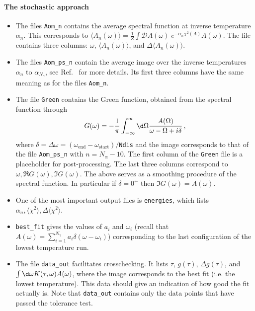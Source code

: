\paragraph*{The stochastic  approach}
\begin{itemize}
\item The files  \texttt{Aom\_n} contains the average spectral function at inverse temperature  $ \alpha_n $. This corresponds to
$  \langle A_n(\omega) \rangle =   \frac{1}{Z}   \int \mathcal{D}\!A(\omega) \; e^{-\alpha_n \chi^{2}(A)  } A(\omega). $
The file contains three columns: $\omega$, $\langle A_n(\omega) \rangle$, and $\Delta \langle A_n(\omega) \rangle$.

\item The files \texttt{Aom\_ps\_n}  contain the average image over the inverse  temperatures  $ \alpha_n $ to $ \alpha_{N_\gamma}$, see Ref.~\cite{Beach04a} for more details.   
 Its first three columns have the same meaning as for the files \texttt{Aom\_n}.

\item The file \texttt{Green} contains the Green function, obtained from the spectral function through
\begin{equation}
 G(\omega) =  -\frac{1}{\pi} \int_{-\infty}^{\infty} \d \Omega   \frac{A(\Omega)}{\omega - \Omega + i \delta} \,,
\end{equation}
where  $ \delta =  \Delta \omega = (\omega_\mathrm{end} -  \omega_\mathrm{start})/$\texttt{Ndis} and the image corresponds to that of the file \texttt{Aom\_ps\_n} with $ n = N_{\alpha} -10 $. 
The first column of the  \texttt{Green}  file is a placeholder for post-processing. The last three columns   correspond to $\omega, \Re G(\omega) ,   \Im G(\omega) $. The above serves as a smoothing procedure of the spectral function. In particular  if $\delta = 0^+$  then  $\Im G(\omega) = A(\omega) $.


\item  One of the most important output files is \texttt{energies}, which lists $ \alpha_n, \langle \chi^2 \rangle, \Delta \langle \chi^2 \rangle $.

\item  \texttt{best\_fit}  gives the values of $a_i$ and $\omega_i$   (recall that $ A(\omega)  = \sum_{i=1}^{N_{\gamma}} a_{i} \delta \left( \omega - \omega_i \right)$) corresponding to the last configuration of the  lowest temperature run.

\item The file \texttt{data\_out} facilitates crosschecking. 
It lists $\tau$,  $g(\tau)$, $\Delta g(\tau)$, and $\int \d \omega  K(\tau, \omega) A(\omega)$, where the image 
corresponds to the best fit (i.e. the lowest temperature). This data should give an indication of how good the fit actually is.
Note that  \texttt{data\_out} contains only the data points that have  passed the tolerance test. 


\end{itemize}
